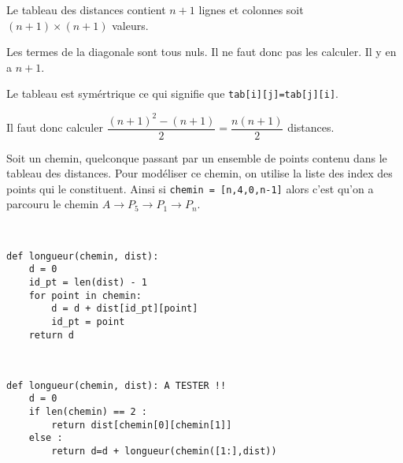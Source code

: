 \ifprof
\begin{corrige}
Le tableau des distances contient  $n+1$ lignes et colonnes soit  $(n+1)\times (n+1)$ valeurs. 

Les termes de la diagonale sont tous nuls. Il ne faut donc pas les calculer. Il y en a $n+1$. 

Le tableau est symértrique ce qui signifie que \texttt{tab[i][j]=tab[j][i]}. 

Il faut donc calculer $\dfrac{(n+1)^2-(n+1)}{2}=\dfrac{n(n+1)}{2}$ distances.

\end{corrige}
\else
\fi

\vspace{.25cm}

Soit un chemin, quelconque passant par un ensemble de points contenu dans le tableau des distances. Pour modéliser ce chemin, on utilise la liste des index des points qui le constituent. 
Ainsi si \texttt{chemin = [n,4,0,n-1]} alors c'est qu'on a parcouru le chemin $A\to P_5 \to P_1 \to P_n$. 



\ifprof
\begin{corrige}~\\ \vspace{-.5cm}
\begin{lstlisting}
def longueur(chemin, dist):
    d = 0
    id_pt = len(dist) - 1
    for point in chemin:
        d = d + dist[id_pt][point]
        id_pt = point
    return d
\end{lstlisting}
\end{corrige}
\else
\fi


\ifprof
\begin{corrige}~\\  \vspace{-.5cm}
\begin{lstlisting}
def longueur(chemin, dist): A TESTER !!
    d = 0
    if len(chemin) == 2 :
        return dist[chemin[0][chemin[1]]
    else : 
        return d=d + longueur(chemin([1:],dist))
\end{lstlisting}
\end{corrige}
\else
\fi
\ifprof
\else
\vspace{.25cm}


